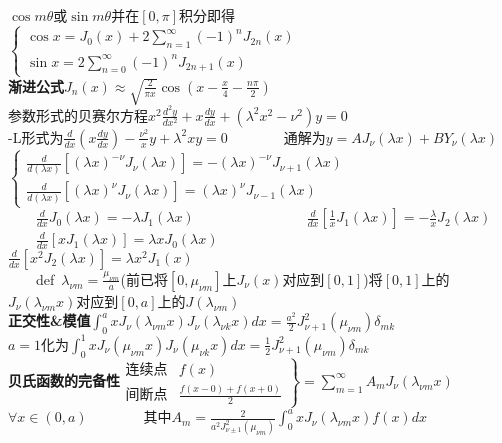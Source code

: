 \documentclass[10pt,a4paper]{article}
\begin{document}
\begin{multicols}{2}
$\cos m\theta$或$\sin m\theta$并在$[0,\pi]$积分即得\scriptsize\\
$\left\{\begin{array}{l}\cos x=J_0(x)+2\sum_{n=1}^{\infty}(-1)^nJ_{2n}(x)\\\sin x=2\sum_{n=0}^{\infty}(-1)^nJ_{2n+1}(x)\end{array}\right.$\\
\textbf{渐进公式}$J_n(x)\approx\sqrt{\frac{2}{\pi x}}\cos(x-\frac{x}{4}-\frac{n\pi}{2})$\\
参数形式的贝赛尔方程$x^2\frac{d^2y}{dx^2}+x\frac{dy}{dx}+(\lambda^2x^2-\nu^2)y=0$\\
-L形式为$\frac{d}{dx}(x\frac{dy}{dx})-\frac{\nu^2}{x}y+\lambda^2xy=0$~~~~~~~~通解为$y=AJ_{\nu}(\lambda x)+BY_{\nu}(\lambda x)$\\
$\left\{\begin{array}{l}\frac{d}{d(\lambda x)}[(\lambda x)^{-\nu}J_{\nu}(\lambda x)]=-(\lambda x)^{-\nu}J_{\nu+1}(\lambda x)\\\frac{d}{d(\lambda x)}[(\lambda x)^{\nu}J_{\nu}(\lambda x)]=(\lambda x)^{\nu}J_{\nu-1}(\lambda x)\end{array}\right.$\\
\indent~~~~$\frac{d}{dx}J_0(\lambda x)=-\lambda J_1(\lambda x)$~~~~~~~~~~~~~~~~$\frac{d}{dx}[\frac{1}{x}J_1(\lambda x)]=-\frac{\lambda}{x}J_2(\lambda x)$\\
\indent~~~~$\frac{d}{dx}[xJ_1(\lambda x)]=\lambda xJ_0(\lambda x)$~~~~~~~~~~~~~~~~$\frac{d}{dx}[x^2J_2(\lambda x)]=\lambda x^2J_1(x)$\\
~~~~def~$\lambda_{\nu m}=\frac{\mu_{\nu m}}{a}$\tiny(前已将$[0,\mu_{\nu m}]$上$J_{\nu}(x)$对应到$[0,1]$)将$[0,1]$上的$J_{\nu}(\lambda_{\nu m}x)$对应到$[0,a]$上的$J(\lambda_{\nu m})$\scriptsize\\
\textbf{正交性\&模值}$\int_0^axJ_{\nu}(\lambda_{\nu m}x)J_{\nu}(\lambda_{\nu k}x)dx=\frac{a^2}{2}J_{\nu+1}^2(\mu_{\nu m})\delta_{mk}$\\
$a=1$化为$\int_0^1xJ_{\nu}(\mu_{\nu m}x)J_{\nu}(\mu_{\nu k}x)dx=\frac{1}{2}J_{\nu+1}^2(\mu_{\nu m})\delta_{mk}$\\
\textbf{贝氏函数的完备性}$\left.\begin{array}{lr}\text{连续点}&f(x)\\\text{间断点}&\frac{f(x-0)+f(x+0)}{2}\end{array}\right\}=\sum_{m=1}^{\infty}A_mJ_{\nu}(\lambda_{\nu m}x)$\\
\indent$\forall x\in(0,a)$~~~~~~~~其中$A_m=\frac{2}{a^2J_{\nu\pm1}^2(\mu_{\nu m})}\int_0^axJ_{\nu}(\lambda_{\nu m}x)f(x)dx$\\

\end{multicols}
\end{document}
